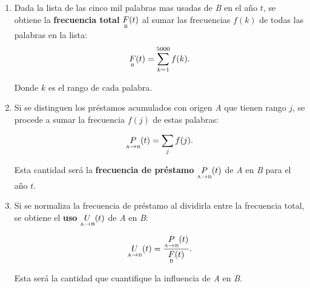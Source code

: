 \begin{enumerate}
	\label{proceso_uso}
	
	\item  Dada la lista de las cinco mil palabras mas usadas de \textit{B} en el año $t$, se obtiene la \textbf{frecuencia total} $\underset{\text{\tiny B}}{F}(t)$ al sumar las frecuencias $f(k)$ de todas las palabras en la lista:
	\begin{equation}
	\label{ec.ftot}
	\underset{\text{\tiny B}}{F}(t) = \sum_{k=1}^{5000} f(k).
	\end{equation}
	 
	 Donde $k$ es el rango  de cada palabra.
	
	\item Si se distinguen los préstamos acumulados con origen \textit{A}  que tienen rango $j$,  se procede a sumar la frecuencia $f(j)$ de estas palabras:
	
	\begin{equation}
	\label{ec.fpres}
	\underset{ \text{\tiny A} \to  \text{\tiny B} }{P}(t) = \sum_{j} f(j).
	\end{equation}
	
	 Esta cantidad será la  \textbf{frecuencia de préstamo} $\underset{ \text{\tiny A} \to  \text{\tiny B} }{P}(t)$   de \textit{A} en \textit{B} para el año $t$.
	
	\item Si se normaliza la frecuencia de préstamo al dividirla entre la frecuencia total, se obtiene el \textbf{uso} $\underset{ \text{\tiny A} \to  \text{\tiny B} }{U}(t)$  de \textit{A} en \textit{B}: 
	
	\begin{equation}
	\label{ec.fuso}
	\underset{ \text{\tiny A} \to  \text{\tiny B} }{U}(t) = \frac{	\underset{ \text{\tiny A} \to  \text{\tiny B} }{P}(t)}{\underset{\text{\tiny B}}{F}(t) }.
	\end{equation}
	
	Esta será la cantidad  que cuantifique la influencia de \textit{A} en \textit{B}.
	
	
	
\end{enumerate}

